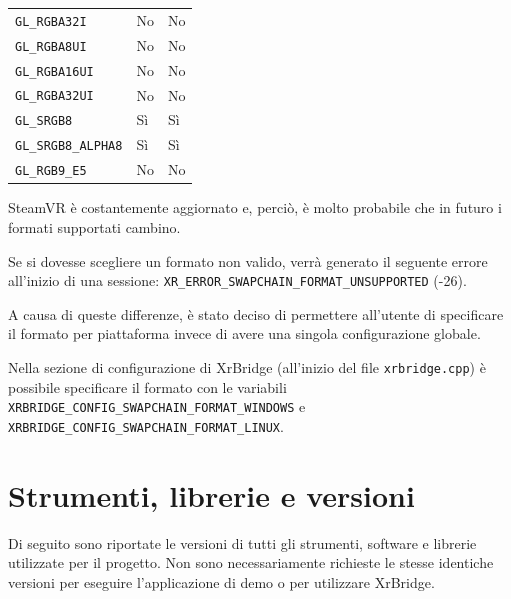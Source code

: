 \documentclass[twoside]{supsistudent}
\begin{document}
\begin{table}[H]
\begin{center}
\begin{tabular}{ l l l }
      \texttt{GL\_RGBA32I}       & No      & No    \\
      \texttt{GL\_RGBA8UI}       & No      & No    \\
      \texttt{GL\_RGBA16UI}      & No      & No    \\
      \texttt{GL\_RGBA32UI}      & No      & No    \\
      \texttt{GL\_SRGB8}         & Sì      & Sì    \\
      \texttt{GL\_SRGB8\_ALPHA8} & Sì      & Sì    \\
      \texttt{GL\_RGB9\_E5}      & No      & No    \\
    \end{tabular}
  \end{center}
\end{table}

SteamVR è costantemente aggiornato e, perciò, è molto probabile che in futuro i formati supportati cambino.

Se si dovesse scegliere un formato non valido, verrà generato il seguente errore all'inizio di una sessione:  \texttt{XR\_ERROR\_SWAPCHAIN\_FORMAT\_UNSUPPORTED} (-26).

A causa di queste differenze, è stato deciso di permettere all'utente di specificare il formato per piattaforma invece di avere una singola configurazione globale.

Nella sezione di configurazione di XrBridge (all'inizio del file \texttt{xrbridge.cpp}) è possibile specificare il formato con le variabili \texttt{XRBRIDGE\_CONFIG\_SWAPCHAIN\_FORMAT\_WINDOWS} e \texttt{XRBRIDGE\_CONFIG\_SWAPCHAIN\_FORMAT\_LINUX}.

\section{Strumenti, librerie e versioni}

Di seguito sono riportate le versioni di tutti gli strumenti, software e librerie utilizzate per il progetto. Non sono necessariamente richieste le stesse identiche versioni per eseguire l'applicazione di demo o per utilizzare XrBridge.

\newpage
\end{document}
